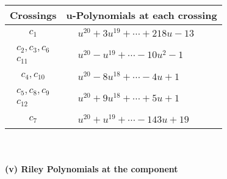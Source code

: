 \documentclass[1p]{elsarticle_modified}
\theoremstyle{definition}
\begin{document}
\begin{tabular}{m{50pt}|m{274pt}}
Crossings & \hspace{64pt}u-Polynomials at each crossing \\
\hline $$\begin{aligned}c_{1}\end{aligned}$$&$\begin{aligned}
&u^{20}+3 u^{19}+\cdots+218 u-13
\end{aligned}$\\
\hline $$\begin{aligned}c_{2},c_{3},c_{6}\\c_{11}\end{aligned}$$&$\begin{aligned}
&u^{20}- u^{19}+\cdots-10 u^2-1
\end{aligned}$\\
\hline $$\begin{aligned}c_{4},c_{10}\end{aligned}$$&$\begin{aligned}
&u^{20}-8 u^{18}+\cdots-4 u+1
\end{aligned}$\\
\hline $$\begin{aligned}c_{5},c_{8},c_{9}\\c_{12}\end{aligned}$$&$\begin{aligned}
&u^{20}+9 u^{18}+\cdots+5 u+1
\end{aligned}$\\
\hline $$\begin{aligned}c_{7}\end{aligned}$$&$\begin{aligned}
&u^{20}+u^{19}+\cdots-143 u+19
\end{aligned}$\\
\hline
\end{tabular}\\~\\
\newpage\renewcommand{\arraystretch}{1}
\flushleft \textbf{(v) Riley Polynomials at the component}\newline \\
\end{document}
